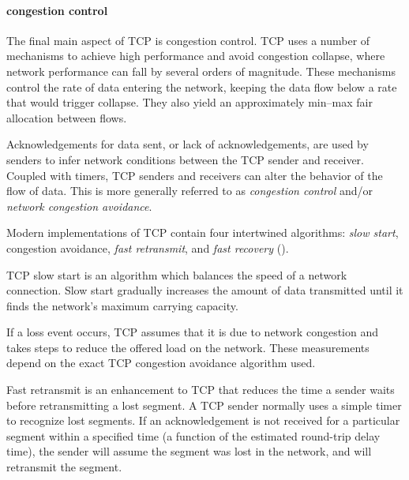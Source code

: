 \paragraph{congestion control}
The final main aspect of \acs{TCP} is congestion control.
\acs{TCP} uses a number of mechanisms to achieve high performance and avoid congestion collapse, where network performance can fall by several orders of magnitude.
These mechanisms control the rate of data entering the network, keeping the data flow below a rate that would trigger collapse.
They also yield an approximately min--max fair allocation between flows.

Acknowledgements for data sent, or lack of acknowledgements, are used by senders to infer network conditions between the \acs{TCP} sender and receiver.
Coupled with timers, \acs{TCP} senders and receivers can alter the behavior of the flow of data.
This is more generally referred to as \emph{congestion control} and/or \emph{network congestion avoidance}.

Modern implementations of \acs{TCP} contain four intertwined algorithms: \emph{slow start}, congestion avoidance, \emph{fast retransmit}, and \emph{fast recovery} ().


\acs{TCP} slow start is an algorithm which balances the speed of a network connection.
Slow start gradually increases the amount of data transmitted until it finds the network's maximum carrying capacity.

If a loss event occurs, \acs{TCP} assumes that it is due to network congestion and takes steps to reduce the offered load on the network.
These measurements depend on the exact \acs{TCP} congestion avoidance algorithm used.

Fast retransmit is an enhancement to \acs{TCP} that reduces the time a sender waits before retransmitting a lost segment.
A \acs{TCP} sender normally uses a simple timer to recognize lost segments.
If an acknowledgement is not received for a particular segment within a specified time (a function of the estimated round-trip delay time), the sender will assume the segment was lost in the network, and will retransmit the segment.

